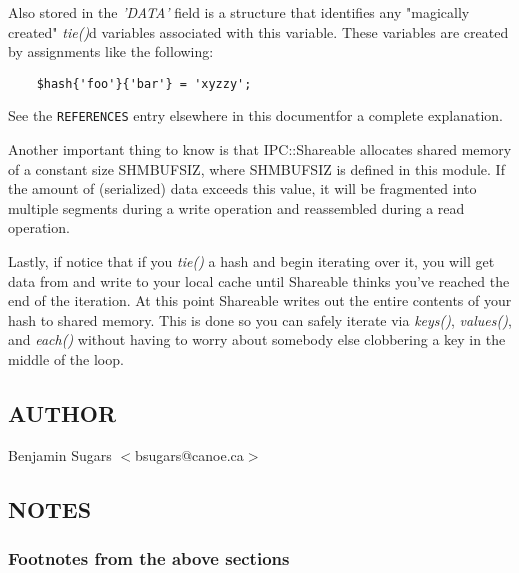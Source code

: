 Also stored in the {\em 'DATA'\/} field is a structure that identifies any
"magically created" {\em tie()\/}d variables associated with this variable.
These variables are created by assignments like the following:
\begin{verbatim}
    $hash{'foo'}{'bar'} = 'xyzzy';
\end{verbatim}

See the {\tt REFERENCES} entry elsewhere in this documentfor a complete explanation.

Another important thing to know is that IPC::Shareable allocates
shared memory of a constant size SHM\underscore{}BUFSIZ, where SHM\underscore{}BUFSIZ is
defined in this module.  If the amount of (serialized) data exceeds
this value, it will be fragmented into multiple segments during a
write operation and reassembled during a read operation.

Lastly, if notice that if you {\em tie()\/} a hash and begin
iterating over it, you will get data from and write to
your local cache until Shareable thinks you've reached
the end of the iteration.  At this point Shareable
writes out the entire contents of your hash to shared
memory.  This is done so you can safely iterate via
{\em keys()\/}, {\em values()\/}, and {\em each()\/} without having to worry
about somebody else clobbering a key in the middle of
the loop.

\subsection*{AUTHOR}
Benjamin Sugars $<$bsugars@canoe.ca$>$

\subsection*{NOTES}
\subsubsection*{Footnotes from the above sections}%

